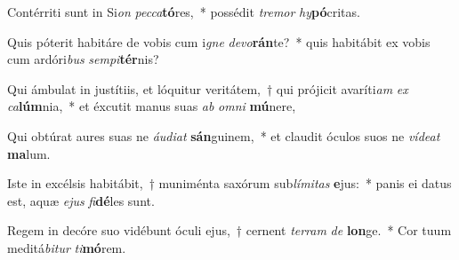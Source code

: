 \item Contérriti sunt in Si\textit{on} \textit{pec}\textit{ca}\textbf{tó}res,~* possédit \textit{tre}\textit{mor} \textit{hy}\textbf{pó}critas.
\item Quis póterit habitáre de vobis cum i\textit{gne} \textit{de}\textit{vo}\textbf{rán}te?~* quis habitábit ex vobis cum ardóri\textit{bus} \textit{sem}\textit{pi}\textbf{tér}nis?
\item Qui ámbulat in justítiis, et lóquitur veritátem,~† qui prójicit avaríti\textit{am} \textit{ex} \textit{ca}\textbf{lúm}nia,~* et éxcutit manus suas \textit{ab} \textit{om}\textit{ni} \textbf{mú}nere,
\item Qui obtúrat aures suas ne \textit{áu}\textit{di}\textit{at} \textbf{sán}guinem,~* et claudit óculos suos ne \textit{ví}\textit{de}\textit{at} \textbf{ma}lum.
\item Iste in excélsis habitábit,~† muniménta saxórum sub\textit{lí}\textit{mi}\textit{tas} \textbf{e}jus:~* panis ei datus est, aquæ \textit{e}\textit{jus} \textit{fi}\textbf{dé}les sunt.
\item Regem in decóre suo vidébunt óculi ejus,~† cernent \textit{ter}\textit{ram} \textit{de} \textbf{lon}ge.~* Cor tuum meditá\textit{bi}\textit{tur} \textit{ti}\textbf{mó}rem.
